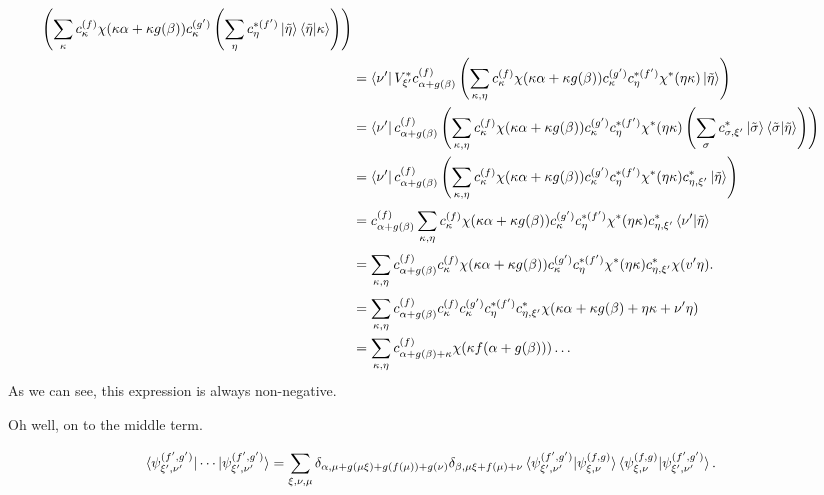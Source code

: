 \documentclass[a4paper]{article}
\begin{document}
\begin{align}
    \left(
      \sum_{\kappa}^{} c_{\kappa}^{(f)}
      \chi(\kappa\alpha + \kappa g(\beta))
      c_{\kappa}^{(g')} \left( 
        \sum_{\eta}^{} c_{\eta}^{*(f')} 
        \ket{\tilde\eta}\braket{\tilde\eta|\kappa}
      \right)  
    \right) \\
    &= \bra{\nu'}V_{\xi'}^*  
    c_{\alpha+g(\beta)}^{(f)}
    \left(
      \sum_{\kappa, \eta}^{} c_{\kappa}^{(f)}
      \chi(\kappa\alpha + \kappa g(\beta))
      c_{\kappa}^{(g')} 
         c_{\eta}^{*(f')} 
        \chi^{*}(\eta\kappa)
        \ket{\tilde\eta}
    \right) \\
    &= \bra{\nu'}  
    c_{\alpha+g(\beta)}^{(f)}
    \left(
      \sum_{\kappa, \eta}^{} c_{\kappa}^{(f)}
      \chi(\kappa\alpha + \kappa g(\beta))
      c_{\kappa}^{(g')} 
         c_{\eta}^{*(f')} 
        \chi^{*}(\eta\kappa)
        \left( 
          \sum_{\sigma}^{} c_{\sigma,\xi'}^{*} \ket{\tilde
          \sigma}\braket{\tilde\sigma|\tilde\eta}
        \right)  
    \right) \\
    &= \bra{\nu'}  
    c_{\alpha+g(\beta)}^{(f)}
    \left(
      \sum_{\kappa, \eta}^{}
      c_{\kappa}^{(f)}
      \chi(\kappa\alpha + \kappa g(\beta))
      c_{\kappa}^{(g')} 
      c_{\eta}^{*(f')} 
      \chi^{*}(\eta\kappa)
      c_{\eta,\xi'}^{*}
      \ket{\tilde\eta}
    \right) \\
    &= c_{\alpha+g(\beta)}^{(f)}
      \sum_{\kappa, \eta}^{} c_{\kappa}^{(f)}
      \chi(\kappa\alpha + \kappa g(\beta))
      c_{\kappa}^{(g')} 
         c_{\eta}^{*(f')} 
        \chi^{*}(\eta\kappa)
          c_{\eta,\xi'}^{*}
          \braket{\nu'|\tilde \eta} \\
    &= \sum_{\kappa, \eta}^{}
    c_{\alpha+g(\beta)}^{(f)}
    c_{\kappa}^{(f)}
    \chi(\kappa\alpha + \kappa g(\beta))
    c_{\kappa}^{(g')} 
    c_{\eta}^{*(f')} 
    \chi^{*}(\eta\kappa)
    c_{\eta,\xi'}^{*}
    \chi(v'\eta). \\
    &= \sum_{\kappa, \eta}^{} 
    c_{\alpha+g(\beta)}^{(f)}
    c_{\kappa}^{(f)}
    c_{\kappa}^{(g')} 
    c_{\eta}^{*(f')} 
    c_{\eta,\xi'}^{*}
    \chi(\kappa\alpha + \kappa g(\beta) + \eta\kappa +
    \nu'\eta) \\
    &= \sum_{\kappa,\eta}
    c^{(f)}_{\alpha+g(\beta)+\kappa}\chi(\kappa f(\alpha +
    g(\beta))) \ldots
  \end{align}
  As we can see, this expression is always non-negative.

  Oh well, on to the middle term.

  \begin{align}
    \bra{\psi_{\xi',\nu'}^{(f',g')}}\cdots
    \ket{\psi_{\xi',\nu'}^{(f',g')}} 
    &= \sum_{\xi,\nu,\mu}^{} \delta_{\alpha,\mu+g(\mu\xi) +
    g(f(\mu)) + g(\nu)} \delta_{\beta,\mu\xi+f(\mu)+\nu}
    \braket{\psi_{\xi',\nu'}^{(f',g')}|
    \psi_{\xi,\nu}^{(f,g)}}
    \braket{\psi_{\xi,\nu}^{(f,g)}|
    \psi_{\xi',\nu'}^{(f',g')}}.
  \end{align}
\end{document}
